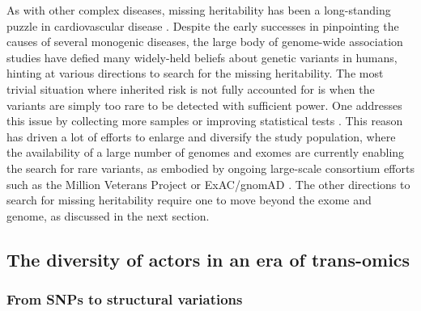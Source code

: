 \documentclass[letter]{bioinfo}
\newcommand{\comment}[1]{\textcolor{red}{#1}}
\begin{document}
As with other complex diseases, missing heritability has been a long-standing puzzle in cardiovascular disease \citep{Manolio:2009:Finding}. Despite the early successes in pinpointing the causes of several monogenic diseases, the large body of genome-wide association studies have defied many widely-held beliefs about genetic variants in humans, hinting at various directions to search for the missing heritability.  The most trivial situation where inherited risk is not fully accounted for is when the variants are simply too rare to be detected with sufficient power. One addresses this issue by collecting more samples \citep{Visscher:2017:10} or improving statistical tests \citep{Zuk:2014:Searching,Kaakinen:2017:rarevariant}.  This reason has driven a lot of efforts to enlarge and diversify the study population, where the availability of a large number of genomes and exomes are currently enabling the search for rare variants, as embodied by ongoing large-scale consortium efforts such as the Million Veterans Project \citep{Gaziano:2016:Million} or ExAC/gnomAD \citep{Lek:2016:Analysis}. The other directions to search for missing heritability require one to move beyond the exome and genome, as discussed in the next section.
	
	
	
	
\subsection*{The diversity of actors in an era of trans-omics}

\subsubsection*{From SNPs to structural variations}
	
	
\end{document}
